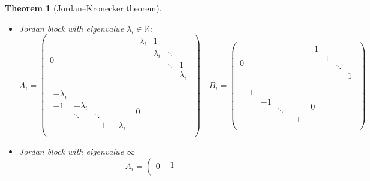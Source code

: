 \documentclass[12pt]{article}
\newtheorem{theorem}[lemma]{Theorem}
\theoremstyle{definition}
\begin{document}
\begin{theorem}[Jordan--Kronecker theorem]
\begin{itemize}
\item Jordan block with eigenvalue $\lambda_i \in \mathbb{K}$: {\scriptsize  \begin{equation} \label{Eq:JordBlockL} A_i =\left(
\begin{array}{c|c}
  0 & \begin{matrix}
   \lambda_i &1&        & \\
      & \lambda_i & \ddots &     \\
      &        & \ddots & 1  \\
      &        &        & \lambda_i   \\
    \end{matrix} \\
  \hline
  \begin{matrix}
  \minus\lambda_i  &        &   & \\
  \minus1   & \minus\lambda_i &     &\\
      & \ddots & \ddots &  \\
      &        & \minus1   & \minus\lambda_i \\
  \end{matrix} & 0
 \end{array}
 \right)
\quad  B_i= \left(
\begin{array}{c|c}
  0 & \begin{matrix}
    1 & &        & \\
      & 1 &  &     \\
      &        & \ddots &   \\
      &        &        & 1   \\
    \end{matrix} \\
  \hline
  \begin{matrix}
  \minus1  &        &   & \\
     & \minus1 &     &\\
      &  & \ddots &  \\
      &        &    & \minus1 \\
  \end{matrix} & 0
 \end{array}
 \right)
\end{equation}} \item Jordan block with eigenvalue $\infty$ {\scriptsize \begin{equation} \label{Eq:JordBlockInf}
A_i = \left(
\begin{array}{c|c}
  0 & \begin{matrix}
   1 & &        & \\

\end{matrix}
\end{array}
\end{equation}}
\end{itemize}
\end{theorem}
\end{document}
